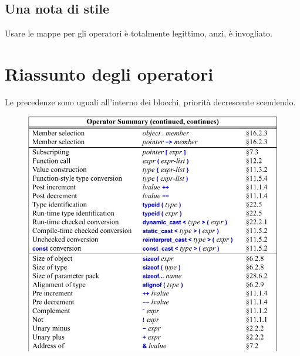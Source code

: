\documentclass[11pt,a4paper]{book}
\begin{document}
\subsection{Una nota di stile}
Usare le mappe per gli operatori è totalmente legittimo, anzi, è invogliato.

\section{Riassunto degli operatori}
Le precedenze sono uguali all'interno dei blocchi, priorità decrescente scendendo.
\begin{figure}[h!]
	\begin{center}
		\includegraphics[scale=0.6]{img/018.jpg}
		\label{fig: 018}
	\end{center}
\end{figure}
\end{document}

